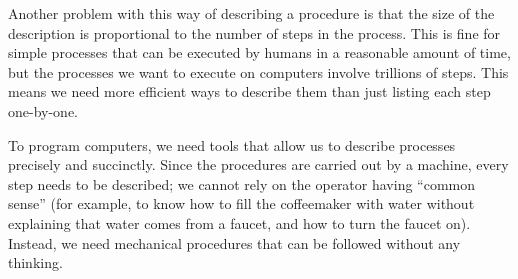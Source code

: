Another problem with this way of describing a procedure is that the size of the description is proportional to the number of steps in the process.  This is fine for simple processes that can be executed by humans in a reasonable amount of time, but the processes we want to execute on computers involve trillions of steps.  This means we need more efficient ways to describe them than just listing each step one-by-one.  

To program computers, we need tools that allow us to describe processes precisely and succinctly.  Since the procedures are carried out by a machine, every step needs to be described; we cannot rely on the operator having ``common sense'' (for example, to know how to fill the coffeemaker with water without explaining that water comes from a faucet, and how to turn the faucet on).  Instead, we need mechanical procedures that can be followed without any thinking.

